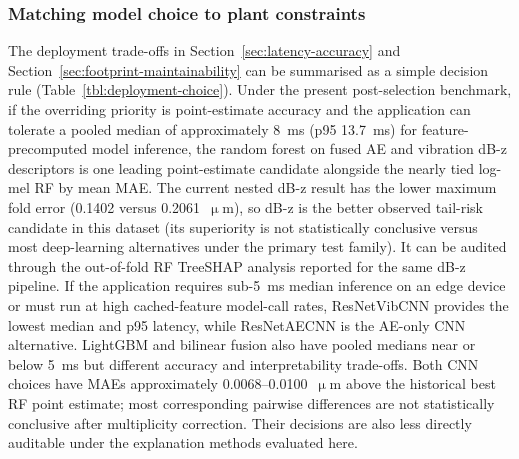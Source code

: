 \subsubsection{Matching model choice to plant
constraints}\label{model-choice-by-constraints}

The deployment trade-offs in Section~\ref{sec:latency-accuracy} and
Section~\ref{sec:footprint-maintainability} can be summarised as a simple
decision rule (Table~\ref{tbl:deployment-choice}). Under the present post-selection benchmark, if the overriding priority
is point-estimate accuracy and the application can tolerate a
pooled median of approximately 8~ms (p95 13.7~ms) for feature-precomputed
model inference, the random
forest on fused AE and vibration dB-z descriptors is one leading
point-estimate candidate alongside the nearly tied log-mel RF by mean MAE.
The current nested dB-z result has the lower maximum fold error
(0.1402 versus 0.2061~\(\upmu\)m), so dB-z is the better observed tail-risk
candidate in this dataset (its
superiority is not statistically conclusive versus most deep-learning
alternatives under the primary test family). It can be audited through the
out-of-fold RF TreeSHAP analysis reported for the same dB-z pipeline. If the application
requires sub-5~ms median inference on an edge device or must run at high
cached-feature model-call rates, ResNetVibCNN provides the lowest median and
p95 latency, while ResNetAECNN is the AE-only CNN alternative. LightGBM and
bilinear fusion also have pooled medians near or below 5~ms but different
accuracy and interpretability trade-offs. Both CNN choices have MAEs
approximately 0.0068--0.0100~\(\upmu\)m above the historical best RF point
estimate; most corresponding pairwise differences are not statistically
conclusive after multiplicity correction. Their decisions are also less
directly auditable under the explanation methods evaluated here.

